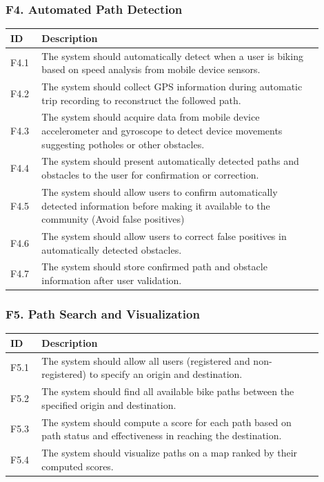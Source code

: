 \subsubsection{F4. Automated Path Detection}
\begin{center}
    \begin{longtable}{ |l|p{0.9\linewidth}| }
        \hline
        \textbf{ID} & \textbf{Description} \\
        \hline
        F4.1 & The system should automatically detect when a user is biking based on speed analysis from mobile device sensors. \\
        \hline
        F4.2 & The system should collect GPS information during automatic trip recording to reconstruct the followed path. \\
        \hline
        F4.3 & The system should acquire data from mobile device accelerometer and gyroscope to detect device movements suggesting potholes or other obstacles. \\
        \hline
        F4.4 & The system should present automatically detected paths and obstacles to the user for confirmation or correction. \\
        \hline
        F4.5 & The system should allow users to confirm automatically detected information before making it available to the community (Avoid false positives) \\
        \hline
        F4.6 & The system should allow users to correct false positives in automatically detected obstacles. \\
        \hline
        F4.7 & The system should store confirmed path and obstacle information after user validation. \\
        \hline
    \end{longtable}
\end{center}

\subsubsection{F5. Path Search and Visualization}
\begin{center}
    \begin{longtable}{ |l|p{0.9\linewidth}| }
        \hline
        \textbf{ID} & \textbf{Description} \\
        \hline
        F5.1 & The system should allow all users (registered and non-registered) to specify an origin and destination. \\
        \hline
        F5.2 & The system should find all available bike paths between the specified origin and destination. \\
        \hline
        F5.3 & The system should compute a score for each path based on path status and effectiveness in reaching the destination. \\
        \hline
        F5.4 & The system should visualize paths on a map ranked by their computed scores. \\
        \hline
    \end{longtable}
\end{center}

